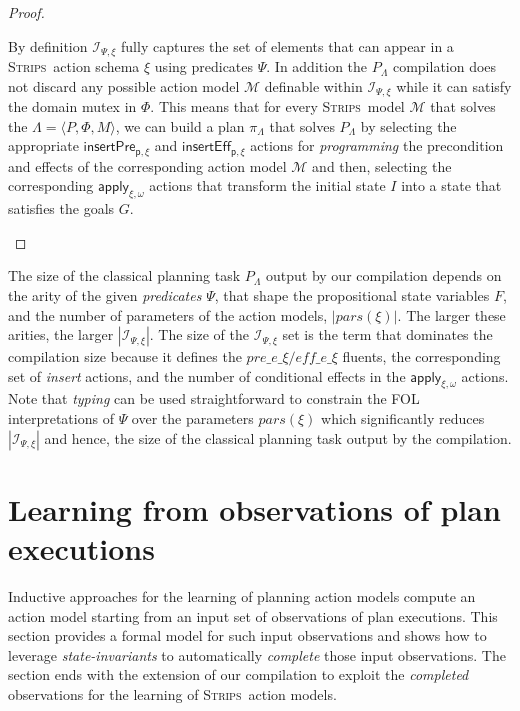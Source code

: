 \documentclass{article}
\newcommand{\tup}[1]{{\langle #1 \rangle}}
\newcommand{\strips}{\textsc{Strips}}
\begin{document}
\begin{proof}[Proof]
\begin{small}
By definition ${\mathcal I}_{\Psi,\xi}$ fully captures the set of elements that can appear in a \strips\ action schema $\xi$ using predicates $\Psi$. In addition the $P_{\Lambda}$ compilation does not discard any possible action model $\mathcal{M}$ definable within ${\mathcal I}_{\Psi,\xi}$ while it can satisfy the domain mutex in $\Phi$. This means that for every \strips\ model $\mathcal{M}$ that solves the $\Lambda=\tup{P,\Phi,M}$, we can build a plan $\pi_{\Lambda}$ that solves $P_{\Lambda}$ by selecting the appropriate $\mathsf{insertPre_{p,\xi}}$ and $\mathsf{insertEff_{p,\xi}}$ actions for {\em programming} the precondition and effects of the corresponding action model $\mathcal{M}$ and then, selecting the corresponding $\mathsf{apply_{\xi,\omega}}$ actions that transform the initial state $I$ into a state that satisfies the goals $G$.
\end{small}
\end{proof}

The size of the classical planning task $P_{\Lambda}$ output by our compilation depends on the arity of the given {\em predicates} $\Psi$, that shape the propositional state variables $F$, and the number of parameters of the action models, $|pars(\xi)|$. The larger these arities, the larger $|{\mathcal I}_{\Psi,\xi}|$. The size of the ${\mathcal I}_{\Psi,\xi}$ set is the term that dominates the compilation size because it defines the $pre\_e\_\xi/eff\_e\_\xi$ fluents, the corresponding set of {\em insert} actions, and the number of conditional effects in the $\mathsf{apply_{\xi,\omega}}$ actions. Note that {\em typing} can be used straightforward to constrain the FOL interpretations of $\Psi$ over the parameters $pars(\xi)$ which significantly reduces $|{\mathcal I}_{\Psi,\xi}|$ and hence, the size of the classical planning task output by the compilation.


\section{Learning from observations of plan executions}
\label{sec:observations}
Inductive approaches for the learning of planning action models compute an action model starting from an input set of observations of plan executions. This section provides a formal model for such input observations and shows how to leverage {\em state-invariants} to automatically {\em complete} those input observations. The section ends with the extension of our compilation to exploit the {\em completed} observations for the learning of \strips\ action models.
\end{document}
